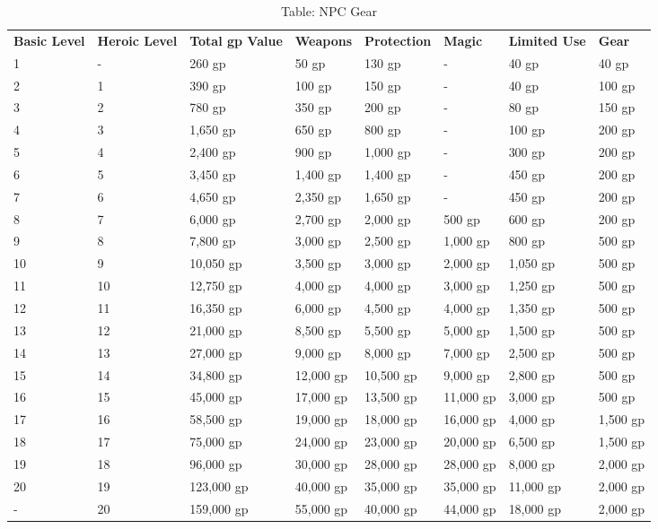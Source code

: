 \begin{table*}[]
\sffamily
\caption{Table: NPC Gear}
\begin{tabular}{llllllll}
\textbf{Basic Level} & \textbf{Heroic Level} & \textbf{Total gp Value} & \textbf{Weapons} & \textbf{Protection} & \textbf{Magic} & \textbf{Limited Use} & \textbf{Gear}\\
1 & - & 260 gp & 50 gp & 130 gp & - & 40 gp & 40 gp \\
 2 & 1 & 390 gp & 100 gp & 150 gp & - & 40 gp & 100 gp \\
 3 & 2 & 780 gp & 350 gp & 200 gp & - & 80 gp & 150 gp \\
 4 & 3 & 1,650 gp & 650 gp & 800 gp & - & 100 gp & 200 gp \\
 5 & 4 & 2,400 gp & 900 gp & 1,000 gp & - & 300 gp & 200 gp \\
 6 & 5 & 3,450 gp & 1,400 gp & 1,400 gp & - & 450 gp & 200 gp \\
 7 & 6 & 4,650 gp & 2,350 gp & 1,650 gp & - & 450 gp & 200 gp \\
 8 & 7 & 6,000 gp & 2,700 gp & 2,000 gp & 500 gp & 600 gp & 200 gp \\
 9 & 8 & 7,800 gp & 3,000 gp & 2,500 gp & 1,000 gp & 800 gp & 500 gp \\
 10 & 9 & 10,050 gp & 3,500 gp & 3,000 gp & 2,000 gp & 1,050 gp & 500 gp \\
 11 & 10 & 12,750 gp & 4,000 gp & 4,000 gp & 3,000 gp & 1,250 gp & 500 gp \\
 12 & 11 & 16,350 gp & 6,000 gp & 4,500 gp & 4,000 gp & 1,350 gp & 500 gp \\
 13 & 12 & 21,000 gp & 8,500 gp & 5,500 gp & 5,000 gp & 1,500 gp & 500 gp \\
 14 & 13 & 27,000 gp & 9,000 gp & 8,000 gp & 7,000 gp & 2,500 gp & 500 gp \\
 15 & 14 & 34,800 gp & 12,000 gp & 10,500 gp & 9,000 gp & 2,800 gp & 500 gp \\
 16 & 15 & 45,000 gp & 17,000 gp & 13,500 gp & 11,000 gp & 3,000 gp & 500 gp \\
 17 & 16 & 58,500 gp & 19,000 gp & 18,000 gp & 16,000 gp & 4,000 gp & 1,500 gp \\
 18 & 17 & 75,000 gp & 24,000 gp & 23,000 gp & 20,000 gp & 6,500 gp & 1,500 gp \\
 19 & 18 & 96,000 gp & 30,000 gp & 28,000 gp & 28,000 gp & 8,000 gp & 2,000 gp \\
 20 & 19 & 123,000 gp & 40,000 gp & 35,000 gp & 35,000 gp & 11,000 gp & 2,000 gp \\
 - & 20 & 159,000 gp & 55,000 gp & 40,000 gp & 44,000 gp & 18,000 gp & 2,000 gp\\
\end{tabular}
\end{table*}
			

